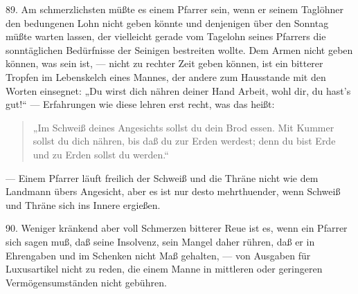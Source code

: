 89. Am schmerzlichsten müßte es einem Pfarrer sein, wenn er seinem Taglöhner den bedungenen Lohn nicht geben könnte und denjenigen über den Sonntag müßte warten lassen, der vielleicht gerade vom Tagelohn seines Pfarrers die sonntäglichen Bedürfnisse der Seinigen bestreiten wollte. Dem Armen nicht geben können, was sein ist, — nicht zu rechter Zeit geben können, ist ein bitterer Tropfen im Lebenskelch eines Mannes, der andere zum Hausstande mit den Worten einsegnet: „Du wirst dich nähren deiner Hand Arbeit, wohl dir, du hast’s gut!“ — Erfahrungen wie diese lehren erst recht, was das heißt:

\begin{quote}
„Im Schweiß deines Angesichts sollst du dein Brod essen. Mit Kummer sollst du dich nähren, bis daß du zur Erden
werdest; denn du bist Erde und zu Erden sollst du werden.“
\end{quote}

— Einem Pfarrer läuft freilich der Schweiß und die Thräne nicht wie dem Landmann übers Angesicht, aber es ist nur desto mehrthuender, wenn Schweiß und Thräne sich ins Innere ergießen.

90. Weniger kränkend aber voll Schmerzen bitterer Reue ist es, wenn ein Pfarrer sich sagen muß, daß seine Insolvenz, sein Mangel daher rühren, daß er in Ehrengaben und im Schenken nicht Maß gehalten, — von Ausgaben für Luxusartikel nicht zu reden, die einem Manne in mittleren oder geringeren Vermögensumständen nicht gebühren.

